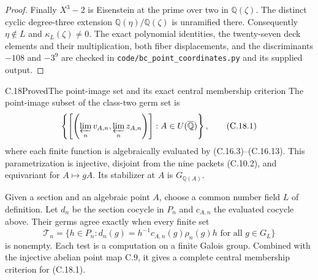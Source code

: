 \begin{proof}
Finally $X^3-2$ is Eisenstein at the
prime over two in $\mathbb Q(\zeta)$.
The distinct cyclic degree-three extension
$\mathbb Q(\eta)/\mathbb Q(\zeta)$ is
unramified there.  Consequently $\eta\notin L$
and $\kappa_L(\zeta)\ne0$.
The exact polynomial identities, the
twenty-seven deck elements and their
multiplication, both fiber displacements,
and the discriminants $-108$ and $-3^9$
are checked in
\texttt{code/bc\_point\_coordinates.py}
and its supplied output.
\end{proof}

\begin{statement}{C.18}{Proved}{The point-image set and its exact central membership criterion}
The point-image subset of the class-two germ set is
\[
 \left\{
   \left[\left(\varprojlim_n v_{A,n},
                   \varprojlim_n z_{A,n}\right)\right]:
                  A\in U(\overline{\mathbb Q})
 \right\},                                                \tag{C.18.1}
\]
where each finite function is algebraically evaluated
by (C.16.3)--(C.16.13).
This parametrization is injective, disjoint from the
nine packets (C.10.2), and equivariant for
$A\mapsto gA$.  Its stabilizer at $A$ is
$G_{\mathbb Q(A)}$.

Given a section and an algebraic point $A$, choose
a common number field $L$ of definition.
Let $d_n$ be the section cocycle in $P_n$ and
$c_{A,n}$ the evaluated cocycle above.
Their germs agree exactly when every finite set
\[
 \mathcal T_n=\{h\in P_n:
 d_n(g)=h^{-1}c_{A,n}(g)\rho_n(g)h
                         \text{ for all }g\in G_L\}
                                                               \tag{C.18.2}
\]
is nonempty.  Each test is a computation on a finite
Galois group.  Combined with the injective abelian
point map C.9, it gives a complete central
membership criterion for (C.18.1).
\end{statement}
